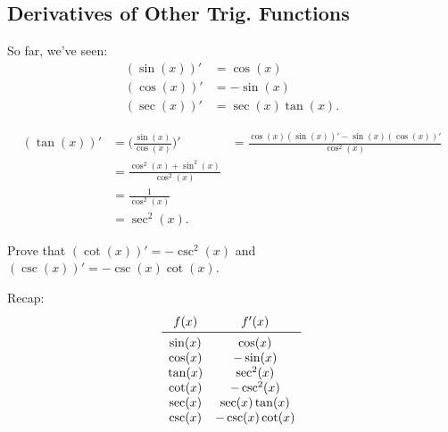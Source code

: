 \subsection{Derivatives of Other Trig. Functions}
So far, we've seen:
\begin{align*}
    (\sin(x))' & =\cos(x)         \\
    (\cos(x))' & =-\sin(x)        \\
    (\sec(x))' & =\sec(x)\tan(x).
\end{align*}
\begin{Example}{}{}
    \begin{align*}
        (\tan(x))'
         & =\biggl(\frac{\sin(x)}{\cos(x)}\biggr)'
         & =\frac{\cos(x)(\sin(x))'-\sin(x)(\cos(x))'}{\cos^2(x)} \\
         & =\frac{\cos^2(x)+\sin^2(x)}{\cos^2(x)}                 \\
         & =\frac{1}{\cos^2(x)}                                   \\
         & =\sec^2(x).
    \end{align*}
\end{Example}
\begin{Exercise}{}{}
    Prove that $ (\cot(x))'=-\csc^2(x) $ and $ (\csc(x))'=-\csc(x)\cot(x) $.
\end{Exercise}
Recap:
\[ \begin{array}{cc}
        f(x)    & f'(x)           \\
        \midrule
        \sin(x) & \cos(x)         \\
        \cos(x) & -\sin(x)        \\
        \tan(x) & \sec^2(x)       \\
        \cot(x) & -\csc^2(x)      \\
        \sec(x) & \sec(x)\tan(x)  \\
        \csc(x) & -\csc(x)\cot(x) \\
    \end{array} \]
